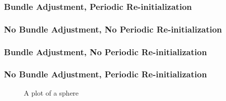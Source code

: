 \documentclass[11pt]{article}
\newlength\figureheight
\newlength\figurewidth
\begin{document}
\subsubsection{Bundle Adjustment, Periodic Re-initialization}

\subsubsection{No Bundle Adjustment, No Periodic Re-initialization}

\subsubsection{Bundle Adjustment, No Periodic Re-initialization}

\subsubsection{No Bundle Adjustment, Periodic Re-initialization}


\begin{figure}
	\centering
	\setlength\figureheight{6cm} 
	\setlength\figurewidth{6cm}
	
	\caption{A plot of a sphere}
	\label{fig:sphere}
\end{figure}
\end{document}
